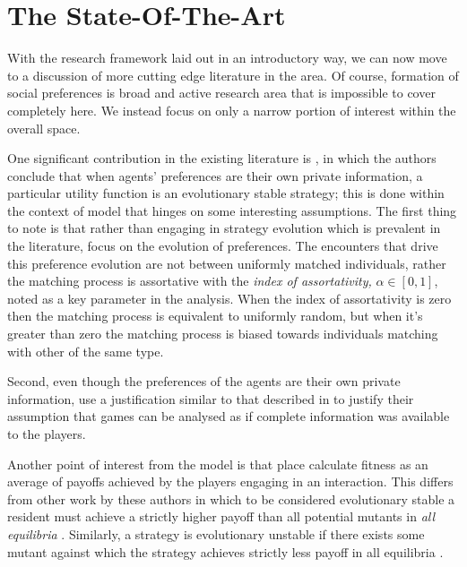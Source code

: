 \documentclass[11pt]{book}
\newcommand*{\np}{\par\noindent\newline}
\begin{document}
\section{The State-Of-The-Art}\label{state_of_the_art}
With the research framework laid out in an introductory way, we can now move to a discussion of more cutting edge
literature in the area. Of course, formation of social preferences is broad and active research area that is impossible
to cover completely here. 
We instead focus on only a narrow portion of interest within the overall space.

\np One significant contribution in the existing literature is \citet{alger_generalization_2012}, in which the authors conclude
that when agents' preferences are their own private information, a particular utility function is an evolutionary stable
strategy; this is done within the context of model that hinges on some interesting assumptions. 
The first thing to note is that rather than engaging in strategy evolution which is prevalent in the literature, \citet{alger_generalization_2012} focus
on the evolution of preferences. 
The encounters that drive this preference evolution are not between uniformly matched individuals, rather the matching process is assortative with the \textit{index of assortativity,} $\alpha \in [0, 1]$,
noted as a key parameter in the analysis. 
When the index of assortativity is zero then the matching process is equivalent to uniformly random, but when it's greater than zero the matching process is biased towards individuals
matching with other of the same type. 

Second, even though the preferences of the agents are their own private information,
 \citeauthor{alger_generalization_2012} use a justification similar to that described in \citet{kalai_rational_1993} 
 to justify their assumption that games can be analysed as if complete information was available to the players.

Another point of interest from the model is that \citeauthor{alger_generalization_2012} place calculate fitness as an average of payoffs achieved by the players engaging in an interaction.
This differs from other work by these authors in which to be considered evolutionary stable a resident must achieve a strictly higher payoff than all potential mutants in \textit{all equilibria} \citep[~p.
2274]{alger_homo_2013}. 
Similarly, a strategy is evolutionary unstable if there exists some mutant against which the
strategy achieves strictly less payoff in all equilibria \citep[~p. 2275]{alger_homo_2013}.
\end{document}
